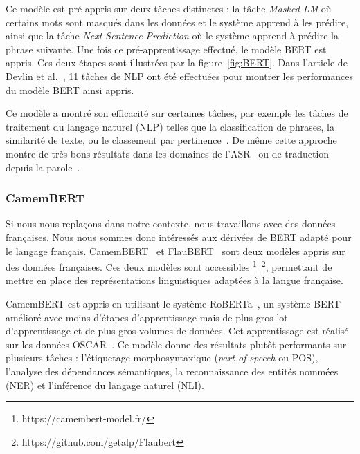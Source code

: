 Ce modèle est pré-appris sur deux tâches distinctes : la tâche \textit{Masked LM} où certains mots sont masqués dans les données et le système apprend à les prédire, ainsi que la tâche \textit{Next Sentence Prediction} où le système apprend à prédire la phrase suivante. Une fois ce pré-apprentissage effectué, le modèle BERT est appris. Ces deux étapes sont illustrées par la figure~\ref{fig:BERT}. Dans l'article de Devlin et al.~\cite{Devlin2019}, 11 tâches de NLP ont été effectuées pour montrer les performances du modèle BERT ainsi appris.   %



Ce modèle a montré son efficacité sur certaines tâches, par exemple %
les tâches de traitement du langage naturel (NLP) telles que la
classification de phrases, la similarité de texte, ou le classement par pertinence~\cite{Liu2019,Young2018,Yang2019}. De même cette approche montre de très bons résultats dans les domaines de l'ASR~\cite{Kahn2020,Liu2020} ou de traduction depuis la parole~\cite{Nguyen2020}.

\subsubsection{CamemBERT}
Si nous nous replaçons dans notre contexte, nous travaillons avec des données françaises. Nous nous sommes donc intéressés aux dérivées de BERT adapté pour le langage français. CamemBERT~\cite{Martin2020} et FlauBERT~\cite{Le2020} sont deux modèles appris sur des données françaises. Ces deux modèles sont accessibles \footnote{https://camembert-model.fr/}~\footnote{https://github.com/getalp/Flaubert}, permettant de mettre en place des représentations linguistiques adaptées à la langue française.

CamemBERT est appris en utilisant le système RoBERTa~\cite{Liu2019Roberta}, un système BERT amélioré avec moins d'étapes d'apprentissage mais de plus gros lot d'apprentissage et de plus gros volumes de données. Cet apprentissage est réalisé sur les données OSCAR~\cite{Ortizsuarez2019}. Ce modèle donne des résultats plutôt performants sur plusieurs tâches : l'étiquetage morphosyntaxique (\textit{part of speech} ou POS), l'analyse des dépendances sémantiques, la reconnaissance des entités nommées (NER) et l'inférence du langage naturel (NLI).

